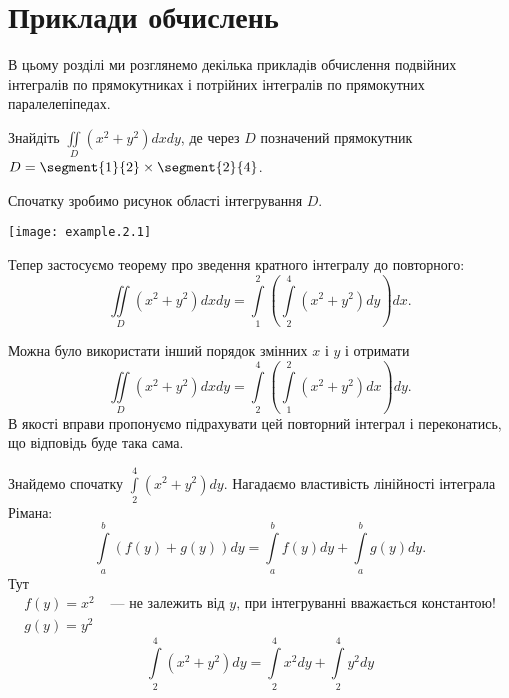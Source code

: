 \chapter{Приклади обчислень}
В цьому розділі ми розглянемо декілька прикладів обчислення подвійних інтегралів по прямокутниках і потрійних інтегралів по прямокутних паралелепіпедах.
\begin{example}
Знайдіть ${\iint\limits_{D}\left(x^2+y^2\right)d x d y}$, де через $D$ позначений пря\-мо\-кут\-ник ${D = \segment{1}{2}\times\segment{2}{4}}$.
\end{example}
\begin{solution}
Спочатку зробимо рисунок області інтегрування $D$.

\texttt{[image: example.2.1]}

Тепер застосуємо теорему про зведення кратного інтегралу до повторного:
\[
\iint\limits_{D}\left(x^2+y^2\right)d x d y = \int\limits_1^2\left(\int\limits_{2}^{4}\left(x^{2}+y^{2}\right)d y\right)dx.
\]
\begin{remark}
Можна було використати інший порядок змінних $x$ і $y$ і отримати
\[
\iint\limits_{D}\left(x^2+y^2\right)d x d y = \int\limits_{2}^{4}\left(\int\limits_1^2\left(x^{2}+y^{2}\right) d x\right)d y.
\]
В якості вправи пропонуємо підрахувати цей повторний інтеграл і переконатись, що відповідь буде така сама.
\end{remark}
Знайдемо спочатку $\int\limits_{2}^{4}\left(x^{2}+y^{2}\right)d y$. Нагадаємо властивість лінійності інтеграла Рімана:
\[
\int\limits_{a}^{b}\left(f(y)+g(y)\right)d y = \int\limits_{a}^{b}f(y)d y+\int\limits_{a}^{b}g(y)d y.
\]
Тут
\[
\begin{array}{cc}
f(y) = x^2 & \mbox{ --- не залежить від } y\mbox{, при інтегруванні вважається константою!}\\
g(y) = y^2 &
\end{array}
\]
\[
\int\limits_{2}^{4}\left(x^{2}+y^{2}\right)d y = \int\limits_{2}^{4}x^{2}d y+\int\limits_{2}^{4}y^{2}d y
\]


\end{solution}

